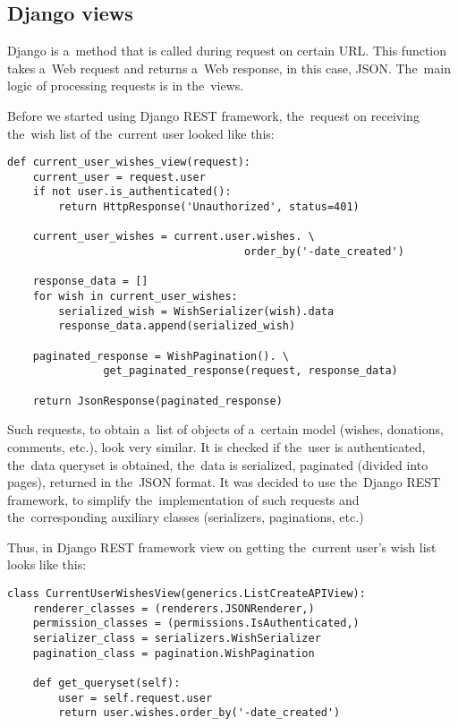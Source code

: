 \subsection{Django views}
Django  is a~method that is called during request on certain \ac{URL}. This function takes a~Web
request and returns a~Web response, in this case, \ac{JSON}. The~main logic of processing requests is in the~views.

Before we started using Django REST framework, the~request on receiving the~wish list of the~current user looked like this:
\begin{lstlisting}
def current_user_wishes_view(request):
    current_user = request.user
    if not user.is_authenticated():
        return HttpResponse('Unauthorized', status=401)

    current_user_wishes = current.user.wishes. \
                                     order_by('-date_created')

    response_data = []
    for wish in current_user_wishes:
        serialized_wish = WishSerializer(wish).data
        response_data.append(serialized_wish)

    paginated_response = WishPagination(). \
               get_paginated_response(request, response_data)

    return JsonResponse(paginated_response)

\end{lstlisting}
Such requests, to obtain a~list of objects of a~certain model (wishes, donations, comments, etc.), look very similar. It
is checked if the~user is authenticated, the~data queryset is obtained, the~data is serialized, paginated (divided into
pages), returned in the~\ac{JSON} format. It was decided to use the~Django REST framework, to simplify
the~implementation of such requests and the~corresponding auxiliary classes (serializers, paginations, etc.)

Thus, in Django REST framework view on getting the~current user's wish list looks like this:

\begin{lstlisting}
class CurrentUserWishesView(generics.ListCreateAPIView):
    renderer_classes = (renderers.JSONRenderer,)
    permission_classes = (permissions.IsAuthenticated,)
    serializer_class = serializers.WishSerializer
    pagination_class = pagination.WishPagination

    def get_queryset(self):
        user = self.request.user
        return user.wishes.order_by('-date_created')
\end{lstlisting}


